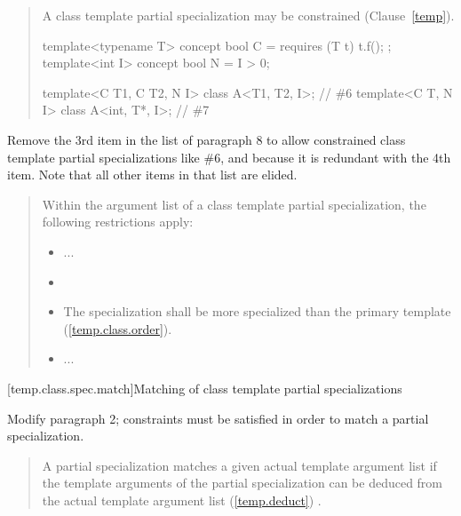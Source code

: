 \begin{quote}
\begin{addedblock}
\setcounter{Paras}{3}
\pnum
A class template partial specialization may be constrained
(Clause~\ref{temp}).
\enterexample
\begin{codeblock}
template<typename T> concept bool C = requires (T t) { t.f(); };
template<int I> concept bool N = I > 0;

template<C T1, C T2, N I> class A<T1, T2, I>;  // \#6
template<C T, N I>        class A<int, T*, I>; // \#7
\end{codeblock}
\exitexample
\end{addedblock}
\end{quote}

Remove the 3rd item in the list of paragraph 8 to allow constrained class 
template partial specializations like \#6, and because it is redundant with 
the 4th item. Note that all other items in that list are elided.

\begin{quote}
\setcounter{Paras}{7}
Within the argument list of a class template partial specialization, 
the following restrictions apply:
\begin{itemize}
\item ...

\item {}

\item The specialization shall be more specialized than the primary
template (\ref{temp.class.order}).

\item ...
\end{itemize}
\end{quote}
 
[temp.class.spec.match]{Matching of class template partial specializations}

Modify paragraph 2; constraints must be satisfied in order
to match a partial specialization. 

\begin{quote}
\setcounter{Paras}{1}
\pnum
A partial specialization matches a given actual template argument list if 
the template arguments of the partial specialization can be deduced from the 
actual template argument list (\ref{temp.deduct}) .
\end{quote}

